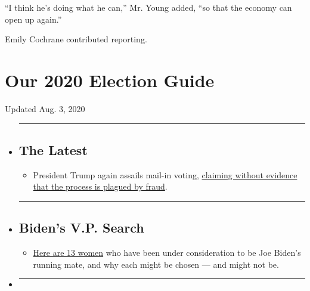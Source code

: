``I think he's doing what he can,'' Mr. Young added, ``so that the
economy can open up again.''

Emily Cochrane contributed reporting.

\hypertarget{our-2020-election-guide}{%
\section{Our 2020 Election Guide}\label{our-2020-election-guide}}

Updated Aug. 3, 2020

\begin{itemize}
\item
  \begin{center}\rule{0.5\linewidth}{\linethickness}\end{center}

  \hypertarget{the-latest}{%
  \subsection{The Latest}\label{the-latest}}

  \begin{itemize}
  \tightlist
  \item
    President Trump again assails mail-in voting,
    \href{https://www.nytimes3xbfgragh.onion/2020/08/03/us/politics/trump-mail-in-voting.html?action=click\&pgtype=Article\&state=default\&region=BELOW_MAIN_CONTENT\&context=storylines_guide}{claiming
    without evidence that the process is plagued by fraud}.
  \end{itemize}
\item
  \begin{center}\rule{0.5\linewidth}{\linethickness}\end{center}

  \hypertarget{bidens-vp-search}{%
  \subsection{Biden's V.P. Search}\label{bidens-vp-search}}

  \begin{itemize}
  \tightlist
  \item
    \href{https://www.nytimes3xbfgragh.onion/article/biden-vice-president-2020.html?action=click\&pgtype=Article\&state=default\&region=BELOW_MAIN_CONTENT\&context=storylines_guide}{Here
    are 13 women} who have been under consideration to be Joe Biden's
    running mate, and why each might be chosen --- and might not be.
  \end{itemize}
\item
  \begin{center}\rule{0.5\linewidth}{\linethickness}\end{center}


\end{itemize}
